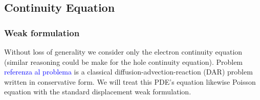 %
%
%





\subsection{Continuity Equation}


\subsubsection{Weak formulation}
Without loss of generality we consider only the electron continuity equation (similar reasoning could be make for the hole continuity equation). Problem \textcolor{blue}{referenza al problema} is a classical diffusion-advection-reaction (DAR) problem written in conservative form. We will treat this PDE's equation likewise Poisson equation with the standard displacement weak formulation.

